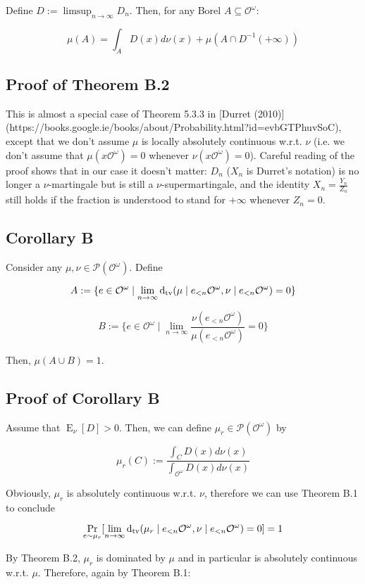 \documentclass[a4paper]{article}
\DeclareMathOperator{\Prb}{Pr}
\DeclareMathOperator{\E}{E}
\newcommand{\Dtv}{\operatorname{d}_{\textnormal{tv}}}
\newcommand{\Prob}{\mathcal{P}}
\newcommand{\Obs}{\mathcal{O}}
\newcommand{\ObsO}{\Obs^\omega}
\begin{document}
Define ${D:= \limsup_{n \rightarrow \infty} D_n}$. Then, for any Borel ${A \subseteq \ObsO}$:

$$\mu(A) = \int_A D(x) d\nu(x) + \mu(A \cap D^{-1}(+\infty))$$

\subsection{Proof of Theorem B.2}

This is almost a special case of Theorem 5.3.3 in [Durret (2010)](https://books.google.ie/books/about/Probability.html?id=evbGTPhuvSoC), except that we don't assume ${\mu}$ is locally absolutely continuous w.r.t. ${\nu}$ (i.e. we don't assume that ${\mu(x\ObsO)=0}$ whenever ${\nu(x\ObsO)=0}$). Careful reading of the proof shows that in our case it doesn't matter: ${D_n}$ (${X_n}$ is Durret's notation) is no longer a ${\nu}$-martingale but is still a ${\nu}$-supermartingale, and the identity ${X_n = \frac{Y_n}{Z_n}}$ still holds if the fraction is understood to stand for ${+\infty}$ whenever ${Z_n = 0}$.

\subsection{Corollary B}

Consider any ${\mu, \nu \in \Prob(\ObsO)}$. Define

$$A:=\{e \in \ObsO \mid \lim_{n \rightarrow \infty} \Dtv(\mu \mid e_{<n}\ObsO, \nu \mid e_{<n}\ObsO) = 0\}$$

$$B:=\{e \in \ObsO \mid \lim_{n \rightarrow \infty} \frac{\nu(e_{<n}\ObsO)}{\mu(e_{<n}\ObsO)} = 0\}$$

Then, ${\mu(A \cup B) = 1}$.

\subsection{Proof of Corollary B}

Assume that ${\E_\nu[D] > 0}$. Then, we can define ${\mu_r \in \Prob(\ObsO)}$ by

$$\mu_r(C):=\frac{\int_{C} D(x) d\nu(x)}{\int_{\ObsO} D(x) d\nu(x)}$$

Obviously, ${\mu_r}$ is absolutely continuous w.r.t. ${\nu}$, therefore we can use Theorem B.1 to conclude

$$\Prb_{e \sim \mu_r}[\lim_{n \rightarrow \infty} \Dtv(\mu_r \mid e_{<n}\ObsO, \nu \mid e_{<n}\ObsO) = 0] = 1$$

By Theorem B.2, ${\mu_r}$ is dominated by ${\mu}$ and in particular is absolutely continuous w.r.t. ${\mu}$. Therefore, again by Theorem B.1:
\end{document}
